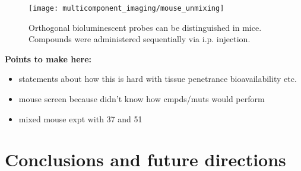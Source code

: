 \begin{figure}[htbp]
\texttt{[image: multicomponent\_imaging/mouse\_unmixing]}
\centering
\caption[Orthogonal bioluminescent probes can be distinguished in mice]{
Orthogonal bioluminescent probes can be distinguished in mice.
Compounds were administered sequentially via i.p. injection.
}
  \label{fig:mouse_unmixing}
\end{figure}
\bf{Points to make here:}
\begin{itemize}
  \item statements about how this is hard with tissue penetrance bioavailability etc.
  \item mouse screen because didn't know how cmpds/muts would perform
  \item mixed mouse expt with 37 and 51
\end{itemize}

\section{Conclusions and future directions}




